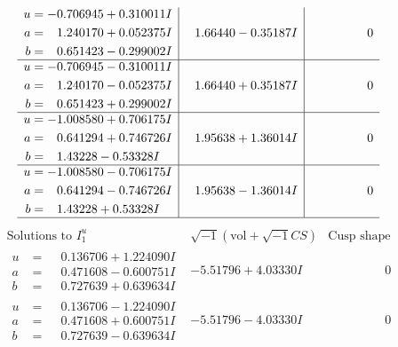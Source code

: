 \documentclass[1p]{elsarticle_modified}
\theoremstyle{definition}
\newcommand{\I}{\sqrt{-1}}
\begin{document}
$$\begin{array}{c|c|c}
\begin{aligned}
u &= -0.706945 + 0.310011 I \\
a &= \phantom{-}1.240170 + 0.052375 I \\
b &= \phantom{-}0.651423 - 0.299002 I\end{aligned}
 & \phantom{-}1.66440 - 0.35187 I & \phantom{-0.000000 } 0 \\ \hline\begin{aligned}
u &= -0.706945 - 0.310011 I \\
a &= \phantom{-}1.240170 - 0.052375 I \\
b &= \phantom{-}0.651423 + 0.299002 I\end{aligned}
 & \phantom{-}1.66440 + 0.35187 I & \phantom{-0.000000 } 0 \\ \hline\begin{aligned}
u &= -1.008580 + 0.706175 I \\
a &= \phantom{-}0.641294 + 0.746726 I \\
b &= \phantom{-}1.43228 - 0.53328 I\end{aligned}
 & \phantom{-}1.95638 + 1.36014 I & \phantom{-0.000000 } 0 \\ \hline\begin{aligned}
u &= -1.008580 - 0.706175 I \\
a &= \phantom{-}0.641294 - 0.746726 I \\
b &= \phantom{-}1.43228 + 0.53328 I\end{aligned}
 & \phantom{-}1.95638 - 1.36014 I & \phantom{-0.000000 } 0\\
 \hline 
 \end{array}$$\newpage$$\begin{array}{c|c|c}  
\text{Solutions to }I^u_{1}& \I (\text{vol} + \sqrt{-1}CS) & \text{Cusp shape}\\
 \hline 
\begin{aligned}
u &= \phantom{-}0.136706 + 1.224090 I \\
a &= \phantom{-}0.471608 - 0.600751 I \\
b &= \phantom{-}0.727639 + 0.639634 I\end{aligned}
 & -5.51796 + 4.03330 I & \phantom{-0.000000 } 0 \\ \hline\begin{aligned}
u &= \phantom{-}0.136706 - 1.224090 I \\
a &= \phantom{-}0.471608 + 0.600751 I \\
b &= \phantom{-}0.727639 - 0.639634 I\end{aligned}
 & -5.51796 - 4.03330 I & \phantom{-0.000000 } 0 \\ \hline\begin{aligned}

\end{aligned}
\end{array}$$
\end{document}

